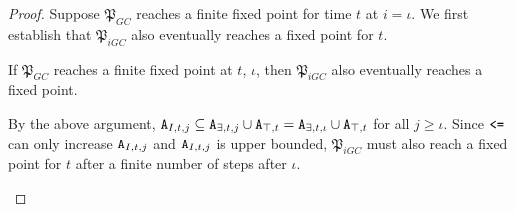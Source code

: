 \begin{proof}
Suppose $\mathfrak{P}_{GC}$ reaches a finite fixed point for time $t$ at $i=\iota$.
We first establish that $\mathfrak{P}_{iGC}$ also eventually reaches a fixed point for $t$.
\begin{claim}
If $\mathfrak{P}_{GC}$ reaches a finite fixed point at $t$, $\iota$, then $\mathfrak{P}_{iGC}$ also eventually reaches a fixed point.
\end{claim}
\begin{claimproof}
By the above argument, $\tt{A}_{I,t,j} \subseteq \tt{A}_{\exists,t,j} \cup \tt{A}_{\top,t} = \tt{A}_{\exists,t,\iota} \cup \tt{A}_{\top,t}$ for all $j \geq \iota$.
Since $\tt{<=}$ can only increase $\tt{A}_{I,t,j}$ and $\tt{A}_{I,t,j}$ is upper bounded, $\mathfrak{P}_{iGC}$ must also reach a fixed point for $t$ after a finite number of steps after $\iota$.
\end{claimproof}


\end{proof}
